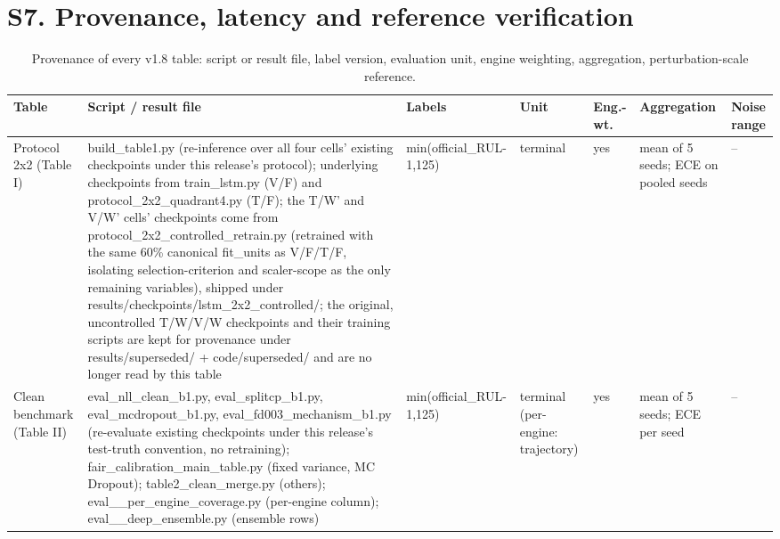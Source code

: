 \documentclass[10pt,a4paper]{article}
\begin{document}
\FloatBarrier
\section*{S7. Provenance, latency and reference verification}
\begin{center}\scriptsize
\begin{longtable}{p{2.0cm}p{3.8cm}p{1.4cm}p{1.4cm}p{0.9cm}p{2.2cm}p{1.2cm}}
\caption{Provenance of every v1.8 table: script or result file, label version, evaluation unit, engine weighting, aggregation, perturbation-scale reference.}\\
\toprule Table & Script / result file & Labels & Unit & Eng.-wt. & Aggregation & Noise range \\ \midrule \endhead
Protocol 2x2 (Table I) & build\_\allowbreak table1\allowbreak .py (re-inference over all four cells' existing checkpoints under this release's protocol); underlying checkpoints from train\_\allowbreak lstm\allowbreak .py (V/F) and protocol\_\allowbreak 2x2\_\allowbreak quadrant4\allowbreak .py (T/F); the T/W' and V/W' cells' checkpoints come from protocol\_\allowbreak 2x2\_\allowbreak controlled\_\allowbreak retrain\allowbreak .py (retrained with the same 60\% canonical fit\_\allowbreak units as V/F/T/F, isolating selection-criterion and scaler-scope as the only remaining variables), shipped under results/checkpoints/lstm\_\allowbreak 2x2\_\allowbreak controlled/; the original, uncontrolled T/W/V/W checkpoints and their training scripts are kept for provenance under results/superseded/ + code/superseded/ and are no longer read by this table & min(official\_\allowbreak RUL-1,125) & terminal & yes & mean of 5 seeds; ECE on pooled seeds & -- \\
Clean benchmark (Table II) & eval\_\allowbreak nll\_\allowbreak clean\_\allowbreak b1\allowbreak .py, eval\_\allowbreak splitcp\_\allowbreak b1\allowbreak .py, eval\_\allowbreak mcdropout\_\allowbreak b1\allowbreak .py, eval\_\allowbreak fd003\_\allowbreak mechanism\_\allowbreak b1\allowbreak .py (re-evaluate existing checkpoints under this release's test-truth convention, no retraining); fair\_\allowbreak calibration\_\allowbreak main\_\allowbreak table\allowbreak .py (fixed variance, MC Dropout); table2\_\allowbreak clean\_\allowbreak merge\allowbreak .py (others); eval\_\allowbreak *\_\allowbreak per\_\allowbreak engine\_\allowbreak coverage\allowbreak .py (per-engine column); eval\_\allowbreak *\_\allowbreak deep\_\allowbreak ensemble\allowbreak .py (ensemble rows) & min(official\_\allowbreak RUL-1,125) & terminal (per-engine: trajectory) & yes & mean of 5 seeds; ECE per seed & -- \\

\end{longtable}
\end{center}
\end{document}
